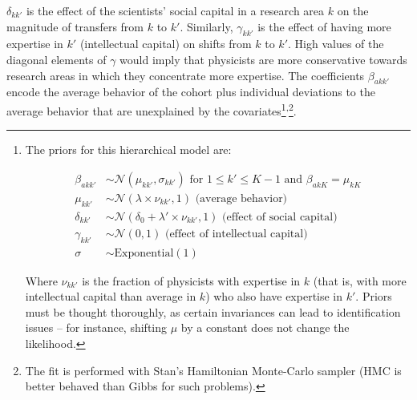 \documentclass{article}
\begin{document}
$\delta_{kk'}$ is the effect of the scientists' social capital in a research area $k$ on the magnitude of transfers from $k$ to $k'$. Similarly, $\gamma_{kk'}$ is the effect of having more expertise in $k'$ (intellectual capital) on shifts from $k$ to $k'$. High values of the diagonal elements of $\gamma$ would imply that physicists are more conservative towards research areas in which they concentrate more expertise. The coefficients $\beta_{akk'}$ encode the average behavior of the cohort plus individual deviations to the average behavior that are unexplained by the covariates\footnote{The priors for this hierarchical model are:

\begin{align}
    \beta_{akk'} &\sim \mathcal{N}(\mu_{k k'},\sigma_{k k'}) \text{ for } 1\leq k' \leq K-1 \text{ and } \beta_{ak K} = \mu_{kK}\label{eq:beta}\\
    \mu_{k k'} &\sim \mathcal{N}(\lambda \times  \nu_{kk'},1) \text{ (average behavior)}\\
    \delta_{kk'} &\sim \mathcal{N}(\delta_0+\lambda ' \times \nu_{kk'},1) \text { (effect of social capital)}\label{eq:social_capital_nu}\\
    \gamma_{kk'} &\sim \mathcal{N}(0,1)  \text { (effect of intellectual capital)}\\
    \sigma &\sim \mathrm{Exponential}(1)
\end{align}

Where $\nu_{kk'}$ is the fraction of physicists with expertise in $k$ (that is, with more intellectual capital than average in $k$) who also have expertise in $k'$. %
Priors must be thought thoroughly, as certain invariances can lead to identification issues -- for instance, shifting $\mu$ by a constant does not change the likelihood.
}\textsuperscript{,}\footnote{The fit is performed with Stan's Hamiltonian Monte-Carlo sampler (HMC is better behaved than Gibbs for such problems).%
}. %
\end{document}
